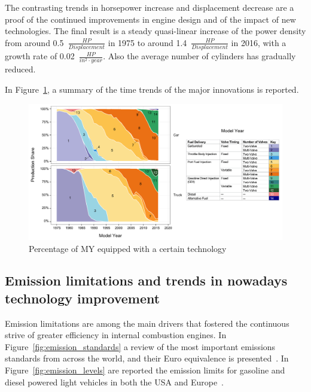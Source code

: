 The contrasting trends in horsepower increase and displacement decrease are a proof of the continued improvements in engine design and of the impact of new technologies. The final result is a steady quasi-linear increase of the power density from around 0.5~$\frac{HP}{Displacement}$ in 1975 to around 1.4~$\frac{HP}{Displacement}$ in 2016, with a growth rate of 0.02~$\frac{HP}{in^{2} \cdot year}$. Also the average number of cylinders has gradually reduced.

In Figure~\ref{fig:technology_trends}, a summary of the time trends of the major innovations is reported.

\begin{figure}[ht]
  \centering  \includegraphics[width=\textwidth]{figures/review/technology_trends.png}
  \caption{Percentage of MY equipped with a certain technology  \label{fig:technology_trends} }
\end{figure}


\subsection{Emission limitations and trends in nowadays technology improvement}
\label{sec:technology_improvements}

Emission limitations are among the main drivers that fostered the continuous strive of greater efficiency in internal combustion engines. In Figure~\ref{fig:emission_standards} a review of the most important emissions standards from across the world, and their Euro equivalence is presented~\cite{Miller2014}. In Figure~\ref{fig:emission_levels} are reported the emission limits for gasoline and diesel powered light vehicles in both the USA and Europe~\cite{Transportpolicy.net2016}.


